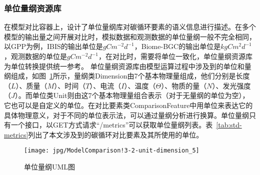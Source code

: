 \subsubsection{单位量纲资源库}
在模型对比容器上，设计了单位量纲库对碳循环要素的语义信息进行描述。在多个模型的输出量之间开展对比时，模拟数据和观测数据的单位量纲一般不完全相同，以GPP为例，IBIS的输出单位是$gC m^{-2} d^{-1}$，Biome-BGC的输出单位是$kgC m^2 d^{-1}$，观测数据的单位是$gC m^{-2} d^{-1}$，在对比时，需要将单位一致化，单位量纲资源库为单位转换提供统一参考。
单位量纲资源库由模型运算过程中涉及到的单位和量纲组成，如图~\ref{fig:ModelComparison!3-2-unit-dimension_5}所示，量纲类Dimension由7个基本物理量组成，他们分别是长度（$L$）、质量（$M$）、时间（$T$）、电流（$I$）、温度（$\Theta$）、物质的量（$N$）、发光强度（$J$）。而单位类Unit则由这7个基本物理量组合表示（对于无量纲的单位为空），它也可以是自定义的单位。在对比要素类ComparisonFeature中用单位来表达它的具体物理意义，对于不同的单位表示法，可以通过量纲分析进行换算。单位量纲只有一个接口，以GET方式请求“/metrics”可以获取单位量纲列表。表~\ref{tab:std-metrics}列出了本文涉及到的碳循环对比要素及其所使用的单位。

\begin{figure}[!htbp]
    \centering
    \texttt{[image: jpg/ModelComparison!3-2-unit-dimension\_5]}
    \caption{单位量纲UML图}
    \label{fig:ModelComparison!3-2-unit-dimension_5}
\end{figure}

